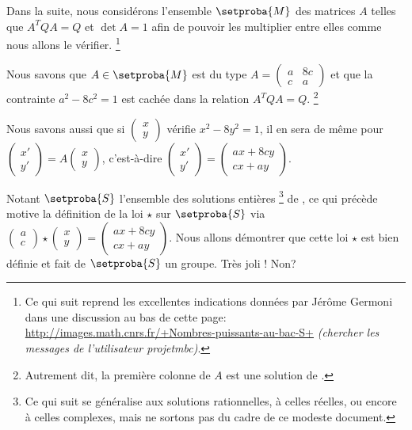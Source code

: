 Dans la suite, nous considérons l'ensemble $\setproba{M}$ des matrices $A$ telles que $A^T Q A = Q$ et $\det A = 1$ afin de pouvoir les multiplier entre elles comme nous allons le vérifier.%
\footnote{
    Ce qui suit reprend les excellentes indications données par Jérôme Germoni dans une discussion au bas de cette page:
\url{http://images.math.cnrs.fr/+Nombres-puissants-au-bac-S+}
\textit{(chercher les messages de l'utilisateur projetmbc)}.
}


\medskip

Nous savons que $A \in \setproba{M}$ est du type
$A
=
\begin{pmatrix}
  a & 8c \\
  c & a
\end{pmatrix}$
et que la contrainte $a^2 - 8c^2 = 1$ est cachée dans la relation $A^T Q A = Q$.%
\footnote{
    Autrement dit, la première colonne de $A$ est une solution de \ED.
}


\medskip

Nous savons aussi que si
$\begin{pmatrix}
  x \\
  y
\end{pmatrix}$
vérifie $x^2 - 8 y^2 = 1$, il en sera de même pour
$\begin{pmatrix}
  x' \\
  y'
\end{pmatrix}
=
A
\begin{pmatrix}
  x \\
  y
\end{pmatrix}$,
c'est-à-dire
$\begin{pmatrix}
  x' \\
  y'
\end{pmatrix}
=
\begin{pmatrix}
  a x + 8c y \\
  c x + a y
\end{pmatrix}$.


\bigskip

Notant $\setproba{S}$ l'ensemble des solutions entières
\footnote{
	Ce qui suit se généralise aux solutions rationnelles, à celles réelles, ou encore à celles complexes, mais ne sortons pas du cadre de ce modeste document.
}
de \ED, ce qui précède motive la définition de la loi $\star$ sur $\setproba{S}$ via
$\begin{pmatrix}
  a \\
  c
\end{pmatrix}
\star
\begin{pmatrix}
  x \\
  y
\end{pmatrix}
=
\begin{pmatrix}
  a x + 8c y \\
  c x + a y
\end{pmatrix}$.
Nous allons démontrer que cette loi $\star$ est bien définie et fait de $\setproba{S}$ un groupe. Très joli ! Non?



